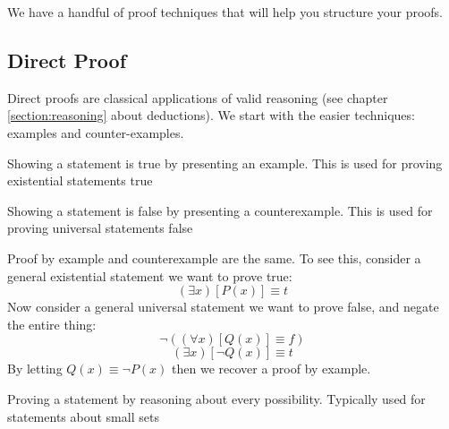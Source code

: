 \documentclass[main.tex]{subfiles}
\begin{document}
We have a handful of proof techniques that will help you structure your proofs.

\subsection{Direct Proof}

Direct proofs are classical applications of valid reasoning (see chapter \ref{section:reasoning} about deductions). We start with the easier techniques: examples and counter-examples.

\begin{defn}
	Showing a statement is true by presenting an example. This is used for proving existential statements true
\end{defn}



\begin{defn}
	Showing a statement is false by presenting a counterexample. This is used for proving universal statements false
\end{defn}


\begin{rem}
	Proof by example and counterexample are the same. To see this, consider a general existential statement we want to prove true: \[(\exists x)[P(x)] \equiv t\]
	Now consider a general universal statement we want to prove false, and negate the entire thing: \[\lnot ((\forall x)[Q(x)] \equiv f)\] \[(\exists x)[\lnot Q(x)] \equiv t\]
	By letting \(Q(x) \equiv \lnot P(x)\) then we recover a proof by example.
\end{rem}

\begin{defn}
	Proving a statement by reasoning about every possibility. Typically used for statements about small sets
\end{defn}

\end{document}
